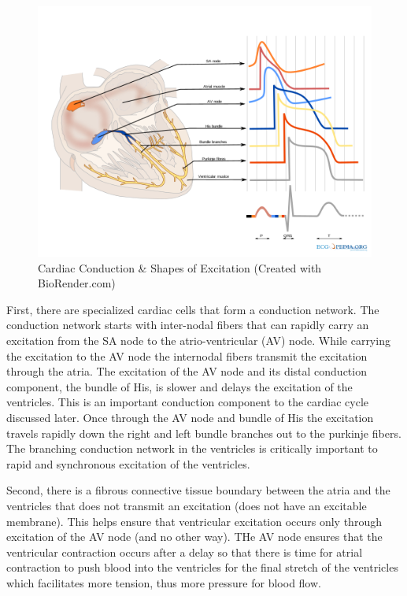 \begin{figure}[!h]
    \centering
    \includegraphics[width=1\linewidth]{./figure/Cardiac_Conduction.png}
    \caption{Cardiac Conduction \& Shapes of Excitation \footnotesize{(Created with BioRender.com)}}
    \label{fig:Cardiac_Conduction}
\end{figure}

First, there are specialized cardiac cells that form a conduction network. The conduction network starts with inter-nodal fibers that can rapidly carry an excitation from the SA node to the atrio-ventricular (AV) node. While carrying the excitation to the AV node the internodal fibers transmit the excitation through the atria. The excitation of the AV node and its distal conduction component, the bundle of His, is slower and delays the excitation of the ventricles. This is an important conduction component to the cardiac cycle discussed later. Once through the AV node and bundle of His the excitation travels rapidly down the right and left bundle branches out to the purkinje fibers. The branching conduction network in the ventricles is critically important to rapid and synchronous excitation of the ventricles. 

Second, there is a fibrous connective tissue boundary between the atria and the ventricles that does not transmit an excitation (does not have an excitable membrane). This helps ensure that ventricular excitation occurs only through excitation of the AV node (and no other way). THe AV node ensures that the ventricular contraction occurs after a delay so that there is time for atrial contraction to push blood into the ventricles for the final stretch of the ventricles which facilitates more tension, thus more pressure for blood flow.

